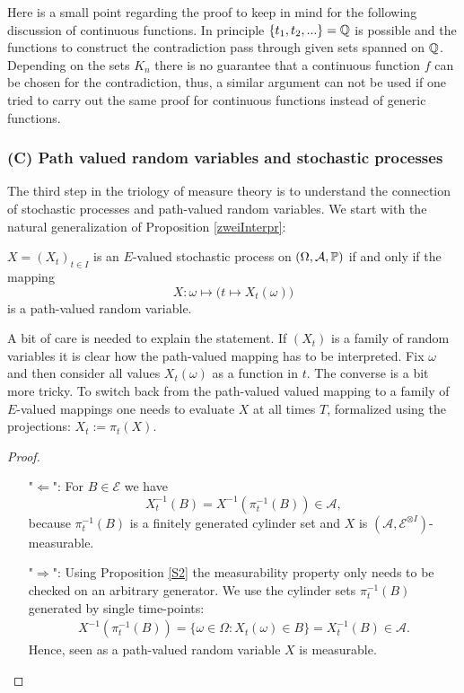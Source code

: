 Here is a small point regarding the proof to keep in mind for the following discussion of continuous functions. In principle $\{t_1,t_2,...\}=\Q$ is possible and the functions to construct the contradiction pass through given sets spanned on $\Q$. Depending on the sets $K_n$ there is no guarantee that a continuous function $f$ can be chosen for the contradiction, thus, a similar argument can not be used if one tried to carry out the same proof for continuous functions instead of generic functions. 

\subsubsection{(C) Path valued random variables and stochastic processes}
The third step in the triology of measure theory is to understand the connection of stochastic processes and path-valued random variables. We start with the natural generalization of Proposition \ref{zweiInterpr}:
\begin{laussagewerkzeug}
\begin{prop}\label{zweiInterprb}
		$X=(X_t)_{t\in I}$ is an $E$-valued stochastic process on $(\Omega, \mathcal A, \P)$ if and only if the mapping $$X:\omega\mapsto \big(t\mapsto X_t(\omega)\big)$$ is a path-valued random variable.
	\end{prop}
\end{laussagewerkzeug}
A bit of care is needed to explain the statement. If $(X_t)$ is a family of random variables it is clear how the path-valued mapping has to be interpreted. Fix $\omega$ and then consider all values $X_t(\omega)$ as a function in $t$. The converse is a bit more tricky. To switch back from the path-valued valued mapping to a family of $E$-valued mappings one needs to evaluate $X$ at all times $T$, formalized using the projections: $X_t:=\pi_t(X)$. 
\begin{proof}[Proof]
	\begin{itemize}
		\item["$\Leftarrow$":] 
		For $B \in \mathcal E$ we have 
\[ X_t^{-1} (B) = X^{-1}(\pi_t^{-1}(B)) \in \mathcal A, \]
because $\pi_t^{-1}(B)$ is a finitely generated cylinder set and $X$ is $(\mathcal A, \mathcal E^{\otimes I})$-measurable.
		\item["$\Rightarrow$":] Using Proposition \ref{S2} the measurability property only needs to be checked on an arbitrary generator. We use the cylinder sets $\pi_t^{-1}(B)$ generated by single time-points:
		\begin{align*}
			X^{-1}(\pi_t^{-1}(B)) =\{\omega \in \Omega: X_t(\omega)\in B\}=X^{-1}_t(B)\in \mathcal A.
		\end{align*}
		Hence, seen as a path-valued random variable $X$ is measurable.
	\end{itemize}
\end{proof}
